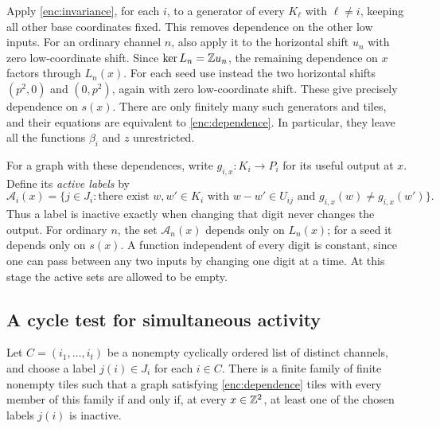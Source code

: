 Apply \cref{enc:invariance}, for each $i$, to a generator of every
$K_\ell$ with $\ell\ne i$, keeping all other base coordinates fixed.
This removes dependence on the other low inputs.  For an ordinary
channel $n$, also apply it to the horizontal shift $u_n$ with zero
low-coordinate shift.  Since $\ker L_n=\mathbb Z u_n$, the remaining
dependence on $x$ factors through $L_n(x)$.  For each seed use instead
the two horizontal shifts $(p^2,0)$ and $(0,p^2)$, again with zero
low-coordinate shift.  These give precisely dependence on $s(x)$.
There are only finitely many such generators and tiles, and their
equations are equivalent to \eqref{enc:dependence}.  In particular,
they leave all the functions $\beta_i$ and $z$ unrestricted.

For a graph with these dependences, write
$g_{i,x}:K_i\to P_i$ for its useful output at $x$.  Define its
\emph{active labels} by
\[
 \mathcal A_i(x)=
 \bigl\{j\in J_i:\text{there exist }w,w'\in K_i
   \text{ with }w-w'\in U_{ij}
   \text{ and }g_{i,x}(w)\ne g_{i,x}(w')\bigr\}.
\]
Thus a label is inactive exactly when changing that digit never
changes the output.  For ordinary $n$, the set $\mathcal A_n(x)$
depends only on $L_n(x)$; for a seed it depends only on $s(x)$.
A function independent of every digit is constant, since one can
pass between any two inputs by changing one digit at a time.
At this stage the active sets are allowed to be empty.

\subsection{A cycle test for simultaneous activity}

\begin{lemma}\label{enc:exclusion}
Let $C=(i_1,\ldots,i_t)$ be a nonempty cyclically ordered list of
distinct channels, and choose a label $j(i)\in J_i$ for each $i\in C$.
There is a finite family of finite nonempty tiles such that a graph
satisfying \eqref{enc:dependence} tiles with every member of this
family if and only if, at every $x\in\mathbb Z^2$, at least one of the
chosen labels $j(i)$ is inactive.
\end{lemma}

